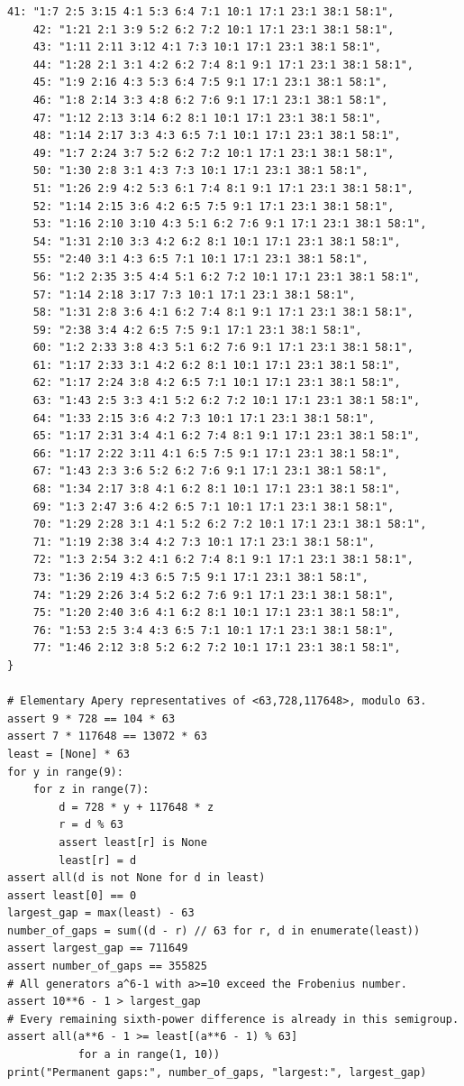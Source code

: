 \documentclass[11pt,a4paper]{article}
\numberwithin{equation}{section}
\theoremstyle{remark}
\begin{document}
\begin{Verbatim}[fontsize=\footnotesize,breaklines,breakanywhere]
    41: "1:7 2:5 3:15 4:1 5:3 6:4 7:1 10:1 17:1 23:1 38:1 58:1",
    42: "1:21 2:1 3:9 5:2 6:2 7:2 10:1 17:1 23:1 38:1 58:1",
    43: "1:11 2:11 3:12 4:1 7:3 10:1 17:1 23:1 38:1 58:1",
    44: "1:28 2:1 3:1 4:2 6:2 7:4 8:1 9:1 17:1 23:1 38:1 58:1",
    45: "1:9 2:16 4:3 5:3 6:4 7:5 9:1 17:1 23:1 38:1 58:1",
    46: "1:8 2:14 3:3 4:8 6:2 7:6 9:1 17:1 23:1 38:1 58:1",
    47: "1:12 2:13 3:14 6:2 8:1 10:1 17:1 23:1 38:1 58:1",
    48: "1:14 2:17 3:3 4:3 6:5 7:1 10:1 17:1 23:1 38:1 58:1",
    49: "1:7 2:24 3:7 5:2 6:2 7:2 10:1 17:1 23:1 38:1 58:1",
    50: "1:30 2:8 3:1 4:3 7:3 10:1 17:1 23:1 38:1 58:1",
    51: "1:26 2:9 4:2 5:3 6:1 7:4 8:1 9:1 17:1 23:1 38:1 58:1",
    52: "1:14 2:15 3:6 4:2 6:5 7:5 9:1 17:1 23:1 38:1 58:1",
    53: "1:16 2:10 3:10 4:3 5:1 6:2 7:6 9:1 17:1 23:1 38:1 58:1",
    54: "1:31 2:10 3:3 4:2 6:2 8:1 10:1 17:1 23:1 38:1 58:1",
    55: "2:40 3:1 4:3 6:5 7:1 10:1 17:1 23:1 38:1 58:1",
    56: "1:2 2:35 3:5 4:4 5:1 6:2 7:2 10:1 17:1 23:1 38:1 58:1",
    57: "1:14 2:18 3:17 7:3 10:1 17:1 23:1 38:1 58:1",
    58: "1:31 2:8 3:6 4:1 6:2 7:4 8:1 9:1 17:1 23:1 38:1 58:1",
    59: "2:38 3:4 4:2 6:5 7:5 9:1 17:1 23:1 38:1 58:1",
    60: "1:2 2:33 3:8 4:3 5:1 6:2 7:6 9:1 17:1 23:1 38:1 58:1",
    61: "1:17 2:33 3:1 4:2 6:2 8:1 10:1 17:1 23:1 38:1 58:1",
    62: "1:17 2:24 3:8 4:2 6:5 7:1 10:1 17:1 23:1 38:1 58:1",
    63: "1:43 2:5 3:3 4:1 5:2 6:2 7:2 10:1 17:1 23:1 38:1 58:1",
    64: "1:33 2:15 3:6 4:2 7:3 10:1 17:1 23:1 38:1 58:1",
    65: "1:17 2:31 3:4 4:1 6:2 7:4 8:1 9:1 17:1 23:1 38:1 58:1",
    66: "1:17 2:22 3:11 4:1 6:5 7:5 9:1 17:1 23:1 38:1 58:1",
    67: "1:43 2:3 3:6 5:2 6:2 7:6 9:1 17:1 23:1 38:1 58:1",
    68: "1:34 2:17 3:8 4:1 6:2 8:1 10:1 17:1 23:1 38:1 58:1",
    69: "1:3 2:47 3:6 4:2 6:5 7:1 10:1 17:1 23:1 38:1 58:1",
    70: "1:29 2:28 3:1 4:1 5:2 6:2 7:2 10:1 17:1 23:1 38:1 58:1",
    71: "1:19 2:38 3:4 4:2 7:3 10:1 17:1 23:1 38:1 58:1",
    72: "1:3 2:54 3:2 4:1 6:2 7:4 8:1 9:1 17:1 23:1 38:1 58:1",
    73: "1:36 2:19 4:3 6:5 7:5 9:1 17:1 23:1 38:1 58:1",
    74: "1:29 2:26 3:4 5:2 6:2 7:6 9:1 17:1 23:1 38:1 58:1",
    75: "1:20 2:40 3:6 4:1 6:2 8:1 10:1 17:1 23:1 38:1 58:1",
    76: "1:53 2:5 3:4 4:3 6:5 7:1 10:1 17:1 23:1 38:1 58:1",
    77: "1:46 2:12 3:8 5:2 6:2 7:2 10:1 17:1 23:1 38:1 58:1",
}

# Elementary Apery representatives of <63,728,117648>, modulo 63.
assert 9 * 728 == 104 * 63
assert 7 * 117648 == 13072 * 63
least = [None] * 63
for y in range(9):
    for z in range(7):
        d = 728 * y + 117648 * z
        r = d % 63
        assert least[r] is None
        least[r] = d
assert all(d is not None for d in least)
assert least[0] == 0
largest_gap = max(least) - 63
number_of_gaps = sum((d - r) // 63 for r, d in enumerate(least))
assert largest_gap == 711649
assert number_of_gaps == 355825
# All generators a^6-1 with a>=10 exceed the Frobenius number.
assert 10**6 - 1 > largest_gap
# Every remaining sixth-power difference is already in this semigroup.
assert all(a**6 - 1 >= least[(a**6 - 1) % 63]
           for a in range(1, 10))
print("Permanent gaps:", number_of_gaps, "largest:", largest_gap)


\end{Verbatim}
\end{document}
